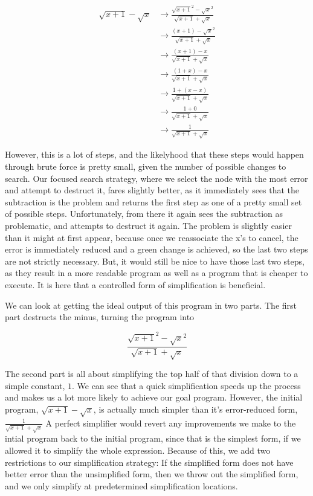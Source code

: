 \documentclass{article}
\newcommand{\sqrsqrt}[1]{\sqrt{#1}^2}
\begin{document}
\begin{align*}
\sqrt{x + 1} - \sqrt{x} &\to \frac{\sqrsqrt{x + 1} - \sqrsqrt{x}}{\sqrt{x + 1} + \sqrt{x}}\\
&\to \frac{(x + 1) - \sqrsqrt{x}}{\sqrt{x + 1} + \sqrt{x}}\\
&\to \frac{(x + 1) - x}{\sqrt{x + 1} + \sqrt{x}}\\
&\to \frac{(1 + x) - x}{\sqrt{x + 1} + \sqrt{x}}\\
&\to \frac{1 + (x - x)}{\sqrt{x + 1} + \sqrt{x}}\\
&\to \frac{1 + 0}{\sqrt{x + 1} + \sqrt{x}}\\
&\to \frac{1}{\sqrt{x + 1} + \sqrt{x}}
\end{align*}

However, this is a lot of steps, 
and the likelyhood that these steps 
would happen through brute force 
is pretty small, 
given the number of possible 
changes to search. 
Our focused search strategy, 
where we select the node 
with the most error 
and attempt to destruct it, 
fares slightly better, 
as it immediately sees that the subtraction is the problem 
and returns the first step as one 
of a pretty small set of possible steps. 
Unfortunately, 
from there it again sees the subtraction as problematic, 
and attempts to destruct it again. 
The problem is slightly easier than it might at first appear, 
because once we reassociate the x's to cancel, 
the error is immediately reduced 
and a green change is achieved, 
so the last two steps are not strictly necessary. 
But, it would still be nice to have those last two steps, 
as they result in a more readable program 
as well as a program that is cheaper to execute. 
It is here that a controlled form 
of simplification is beneficial.

We can look at getting the ideal output
 of this program 
in two parts. 
The first part destructs the minus, 
turning the program into

\[\frac{\sqrsqrt{x + 1} - \sqrsqrt{x}}{\sqrt{x + 1} + \sqrt{x}}\]

The second part is all about simplifying 
the top half of that division 
down to a simple constant, 
$1$. 
We can see 
that a quick simplification 
speeds up the process 
and makes us a lot more likely 
to achieve our goal program. 
However, the initial program, 
$\sqrt{x + 1} - \sqrt{x}$, 
is actually much simpler 
than it's error-reduced form,
$\frac{1}{\sqrt{x + 1} + \sqrt{x}}$
A perfect simplifier 
would revert any improvements we make 
to the intial program 
back to the initial program, 
since that is the simplest form, 
if we allowed it to simplify the whole expression. 
Because of this, 
we add two restrictions 
to our simplification strategy: 
If the simplified form 
does not have better error 
than the unsimplified form, 
then we throw out 
the simplified form, 
and we only simplify 
at predetermined simplification locations.
\end{document}
